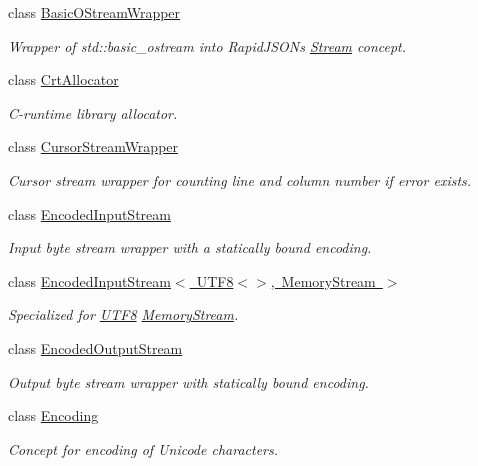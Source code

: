 \begin{DoxyCompactItemize}
class \mbox{\hyperlink{classrapidjson_1_1_basic_o_stream_wrapper}{Basic\+O\+Stream\+Wrapper}}
\begin{DoxyCompactList}\small\item\em Wrapper of {\ttfamily std\+::basic\+\_\+ostream} into Rapid\+J\+S\+ON\textquotesingle{}s \mbox{\hyperlink{classrapidjson_1_1_stream}{Stream}} concept. \end{DoxyCompactList}\item 
class \mbox{\hyperlink{classrapidjson_1_1_crt_allocator}{Crt\+Allocator}}
\begin{DoxyCompactList}\small\item\em C-\/runtime library allocator. \end{DoxyCompactList}\item 
class \mbox{\hyperlink{classrapidjson_1_1_cursor_stream_wrapper}{Cursor\+Stream\+Wrapper}}
\begin{DoxyCompactList}\small\item\em Cursor stream wrapper for counting line and column number if error exists. \end{DoxyCompactList}\item 
class \mbox{\hyperlink{classrapidjson_1_1_encoded_input_stream}{Encoded\+Input\+Stream}}
\begin{DoxyCompactList}\small\item\em Input byte stream wrapper with a statically bound encoding. \end{DoxyCompactList}\item 
class \mbox{\hyperlink{classrapidjson_1_1_encoded_input_stream_3_01_u_t_f8_3_4_00_01_memory_stream_01_4}{Encoded\+Input\+Stream$<$ U\+T\+F8$<$$>$, Memory\+Stream $>$}}
\begin{DoxyCompactList}\small\item\em Specialized for \mbox{\hyperlink{structrapidjson_1_1_u_t_f8}{U\+T\+F8}} \mbox{\hyperlink{structrapidjson_1_1_memory_stream}{Memory\+Stream}}. \end{DoxyCompactList}\item 
class \mbox{\hyperlink{classrapidjson_1_1_encoded_output_stream}{Encoded\+Output\+Stream}}
\begin{DoxyCompactList}\small\item\em Output byte stream wrapper with statically bound encoding. \end{DoxyCompactList}\item 
class \mbox{\hyperlink{classrapidjson_1_1_encoding}{Encoding}}
\begin{DoxyCompactList}\small\item\em Concept for encoding of Unicode characters. \end{DoxyCompactList}\item 

\end{DoxyCompactItemize}
